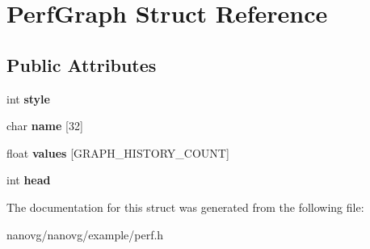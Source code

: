 \hypertarget{struct_perf_graph}{\section{Perf\+Graph Struct Reference}
\label{struct_perf_graph}
}
\subsection*{Public Attributes}
\begin{DoxyCompactItemize}
\item 
\hypertarget{struct_perf_graph_a0aa8f294ed1eee979ded828d3208b39e}{int {\bfseries style}}\label{struct_perf_graph_a0aa8f294ed1eee979ded828d3208b39e}

\item 
\hypertarget{struct_perf_graph_a8abe0c9b9f33916090cc186c489bd4f0}{char {\bfseries name} \mbox{[}32\mbox{]}}\label{struct_perf_graph_a8abe0c9b9f33916090cc186c489bd4f0}

\item 
\hypertarget{struct_perf_graph_a98e2a254e5a66226a5fac6a5c26eea7c}{float {\bfseries values} \mbox{[}G\+R\+A\+P\+H\+\_\+\+H\+I\+S\+T\+O\+R\+Y\+\_\+\+C\+O\+U\+N\+T\mbox{]}}\label{struct_perf_graph_a98e2a254e5a66226a5fac6a5c26eea7c}

\item 
\hypertarget{struct_perf_graph_ac2e6534450ce170d33608a56f07c1794}{int {\bfseries head}}\label{struct_perf_graph_ac2e6534450ce170d33608a56f07c1794}

\end{DoxyCompactItemize}


The documentation for this struct was generated from the following file\+:\begin{DoxyCompactItemize}
\item 
nanovg/nanovg/example/perf.\+h\end{DoxyCompactItemize}
